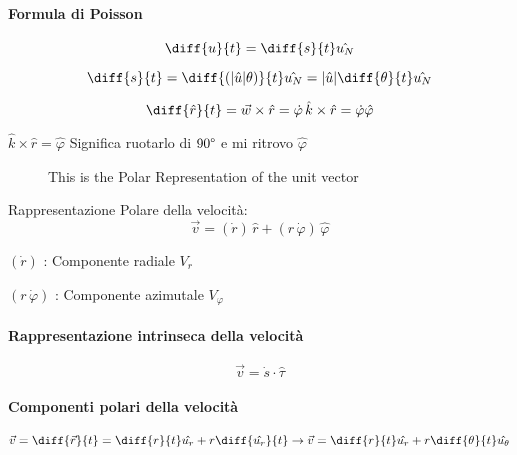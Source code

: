 \paragraph{Formula di Poisson}

$$ \diff{u}{t} = \diff{s}{t} \hat{u_N}$$

$$ \diff{s}{t} = \diff{(|\hat{u}| \theta)}{t} \hat{u_N} = |\hat{u}| \diff{\theta}{t} \hat{u_N} $$

\begin{equation}
  \diff{\hat{r}}{t} = \vec{w} \times \hat{r}
  = \dot{\varphi} \, \hat{k} \times \hat{r}
  = \dot{\varphi} \hat{\varphi}
\end{equation}

$ \hat{k} \times \hat{r} = \hat{\varphi} $ Significa ruotarlo di
$90\degree$ e mi ritrovo $ \hat{\varphi}$


\begin{figure}
  \centering
  \resizebox{.5\textwidth}{!}{}
  \caption{This is the Polar Representation of the unit vector}
\end{figure}


Rappresentazione Polare della velocità:
\begin{equation}
  \vec{v} =(\dot{r}) \, \hat{r}
  + (r \, \dot{\varphi}) \, \hat{\varphi}
\end{equation}

\begin{list}{-}{Componenti:}
  \item $(\dot{r})$ : Componente radiale $V_r$
  \item $(r \, \dot{\varphi})$ : Componente azimutale $V_{\varphi}$
\end{list}

\paragraph{Rappresentazione intrinseca della velocità}

$$ \vec{v} = \dot{s} \cdot \hat{\tau} $$

\paragraph{Componenti polari della velocità}

\begin{equation}
  \vec{v} = \diff{\vec{r}}{t} = \diff{r}{t} \hat{u_r} + r \diff{\hat{u_r}}{t}
  \rightarrow \vec{v} = \diff{r}{t} \hat{u_r} + r \diff{\theta}{t} \hat{u_{\theta}}
\end{equation}